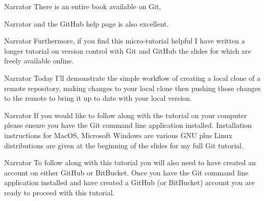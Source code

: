 \documentclass{screenplay} %
\begin{document}
\begin{dialogue}{Narrator} 
There is an entire book available on Git,
\end{dialogue}

\begin{dialogue}{Narrator} 
and the GitHub help page is also excellent.
\end{dialogue}

\begin{dialogue}{Narrator} 
Furthermore, if you find this micro-tutorial helpful I have written a longer tutorial on version control with Git and GitHub the slides for which are freely available online.
\end{dialogue}

\begin{dialogue}{Narrator} 
Today I'll demonstrate the simple workflow of creating a local clone of a remote repository, making changes to your local clone then pushing those changes to the remote to bring it up to date with your local version.
\end{dialogue}

\begin{dialogue}{Narrator} If you would like to follow along with the tutorial on your computer please ensure you have the Git command line application installed.  Installation instructions for MacOS, Microsoft Windows are various GNU plus Linux distributions are given at the beginning of the slides for my full Git tutorial.
\end{dialogue} 

\begin{dialogue}{Narrator}
To follow along with this tutorial you will also need to have created an account on either GitHub or BitBucket.  Once you have the Git command line application installed and have created a GitHub (or BitBucket) account you are ready to proceed with this tutorial.
\end{dialogue}
\end{document}
